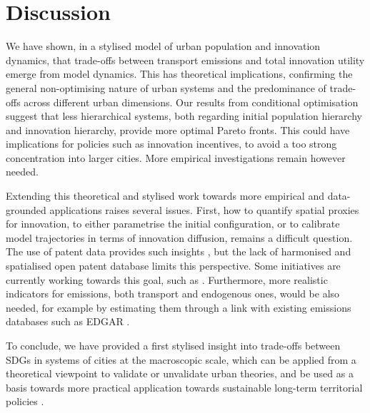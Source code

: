\documentclass{article}
\begin{document}
\section{Discussion}

We have shown, in a stylised model of urban population and innovation dynamics, that trade-offs between transport emissions and total innovation utility emerge from model dynamics. This has theoretical implications, confirming the general non-optimising nature of urban systems and the predominance of trade-offs across different urban dimensions. Our results from conditional optimisation suggest that less hierarchical systems, both regarding initial population hierarchy and innovation hierarchy, provide more optimal Pareto fronts. This could have implications for policies such as innovation incentives, to avoid a too strong concentration into larger cities. More empirical investigations remain however needed.

Extending this theoretical and stylised work towards more empirical and data-grounded applications raises several issues. First, how to quantify spatial proxies for innovation, to either parametrise the initial configuration, or to calibrate model trajectories in terms of innovation diffusion, remains a difficult question. The use of patent data provides such insights \cite{griliches200713}, but the lack of harmonised and spatialised open patent database limits this perspective. Some initiatives are currently working towards this goal, such as \cite{bergeaud2021patentcity}. Furthermore, more realistic indicators for emissions, both transport and endogenous ones, would be also needed, for example by estimating them through a link with existing emissions databases such as EDGAR \cite{olivier1994emission}.

To conclude, we have provided a first stylised insight into trade-offs between SDGs in systems of cities at the macroscopic scale, which can be applied from a theoretical viewpoint to validate or unvalidate urban theories, and be used as a basis towards more practical application towards sustainable long-term territorial policies \cite{rozenblat2018conclusion}.


\newpage



\end{document}
